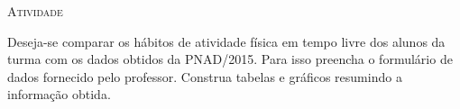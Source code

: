 \documentclass[10 pt,usenames,dvipsnames, oneside]{article}
\begin{document}
\bigskip
\begin{center}
{\large \scshape Atividade}
\end{center}
\fi

Deseja-se comparar os hábitos de atividade física em tempo livre dos alunos da turma com os dados obtidos da PNAD/2015. Para isso preencha o formulário de dados fornecido pelo professor. Construa tabelas e gráficos resumindo a informação obtida.
\end{document}
